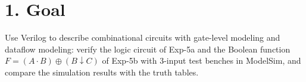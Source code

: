\section*{1. Goal}
Use Verilog to describe combinational circuits with gate-level modeling and dataflow modeling: verify the logic circuit of Exp-5a and the Boolean function $F = (A \cdot B) \oplus (B \downarrow C)$ of Exp-5b with 3-input test benches in ModelSim, and compare the simulation results with the truth tables.
